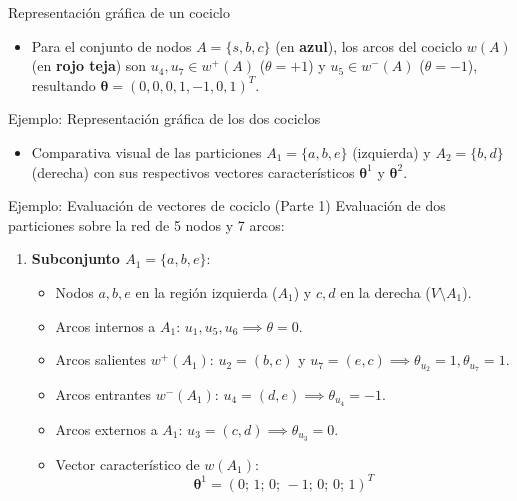\documentclass[
  ignorenonframetext,
]{beamer}
\providecommand{\tightlist}{%
  \setlength{\itemsep}{0pt}\setlength{\parskip}{0pt}}
\begin{document}
\begin{frame}{Representación gráfica de un cociclo}
\label{representaciuxf3n-gruxe1fica-de-un-cociclo}
\begin{itemize}
\tightlist
\item
  Para el conjunto de nodos \(A = \{s, b, c\}\) (en \textbf{azul}), los
  arcos del cociclo \(w(A)\) (en \textbf{rojo teja}) son
  \(u_4, u_7 \in w^+(A)\) (\(\theta = +1\)) y \(u_5 \in w^-(A)\)
  (\(\theta = -1\)), resultando
  \(\mathbf{\theta} = (0, 0, 0, 1, -1, 0, 1)^T\).
\end{itemize}
\end{frame}

\begin{frame}{Ejemplo: Representación gráfica de los dos cociclos}
\label{ejemplo-representaciuxf3n-gruxe1fica-de-los-dos-cociclos}
\begin{itemize}
\tightlist
\item
  Comparativa visual de las particiones \(A_1 = \{a, b, e\}\)
  (izquierda) y \(A_2 = \{b, d\}\) (derecha) con sus respectivos
  vectores característicos \(\mathbf{\theta}^1\) y
  \(\mathbf{\theta}^2\).
\end{itemize}
\end{frame}

\begin{frame}{Ejemplo: Evaluación de vectores de cociclo (Parte 1)}
\label{ejemplo-evaluaciuxf3n-de-vectores-de-cociclo-parte-1}
Evaluación de dos particiones sobre la red de 5 nodos y 7 arcos:

\begin{enumerate}
\tightlist
\item
  \textbf{Subconjunto \(A_1 = \{a, b, e\}\)}:

  \begin{itemize}
  \tightlist
  \item
    Nodos \(a, b, e\) en la región izquierda (\(A_1\)) y \(c, d\) en la
    derecha (\(V \setminus A_1\)).
  \item
    Arcos internos a \(A_1\): \(u_1, u_5, u_6 \implies \theta = 0\).
  \item
    Arcos salientes \(w^+(A_1)\): \(u_2=(b,c)\) y
    \(u_7=(e,c) \implies \theta_{u_2} = 1, \theta_{u_7} = 1\).
  \item
    Arcos entrantes \(w^-(A_1)\):
    \(u_4=(d,e) \implies \theta_{u_4} = -1\).
  \item
    Arcos externos a \(A_1\): \(u_3=(c,d) \implies \theta_{u_3} = 0\).
  \item
    Vector característico de \(w(A_1)\):
    \[\mathbf{\theta}^1 = (0;\, 1;\, 0;\, -1;\, 0;\, 0;\, 1)^T\]
  \end{itemize}
\end{enumerate}
\end{frame}
\end{document}
